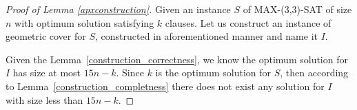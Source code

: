 \begin{proof}[Proof of Lemma \ref{apxconstruction}]
Given an instance $S$ of MAX-(3,3)-SAT of size $n$
with optimum solution satisfying $k$ clauses.
Let us construct an instance of geometric cover for $S$,
constructed in aforementioned manner and name it $I$.

Given the Lemma~\ref{construction_correctness}, we know
the optimum solution for $I$ has size
at most $15n - k$. Since $k$ is the optimum solution
for $S$, then according to Lemma~\ref{construction_completness}
there does not exist any solution 
for $I$
with size less than $15n - k$.
\end{proof}
